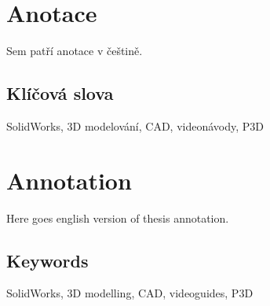 \documentclass{template/template}
\author{Petr Štourač} %
\begin{document}

\maketitle



\makethanks{}

\pagestyle{empty}

\section*{Anotace}
Sem patří anotace v češtině.

\subsection*{Klíčová slova}
SolidWorks, 3D modelování, CAD, videonávody, P3D

\vspace{20mm}

\section*{Annotation}
Here goes english version of thesis annotation.


\subsection*{Keywords}
SolidWorks, 3D modelling, CAD, videoguides, P3D

\newpage
\pagestyle{plain}

\tableofcontents %

\setcounter{figure}{0}
\setcounter{table}{0}
\newpage








\newpage

\appendix
{}




\listoffigures
{}

\listoftables
{}
\end{document}
